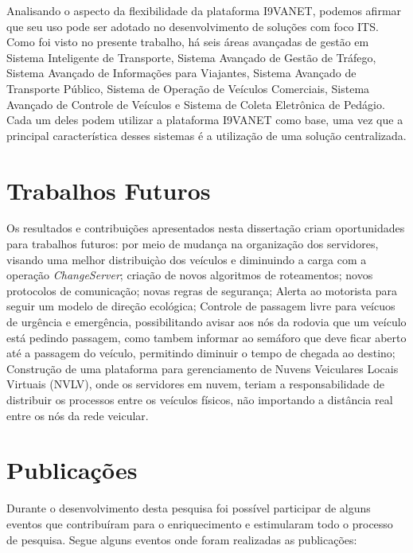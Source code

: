 \documentclass[
	12pt,				%
	oneside,			%
	a4paper,			%
	english,			%
	brazil				%
	]{abntex2ppgsi}
\begin{document}
Analisando o aspecto da flexibilidade da plataforma I9VANET, podemos afirmar que seu uso pode ser adotado no desenvolvimento de soluções com foco ITS. Como foi visto no presente trabalho, há seis áreas avançadas de gestão em Sistema Inteligente de Transporte, Sistema Avançado de Gestão de Tráfego, Sistema Avançado de Informações para Viajantes, Sistema Avançado de Transporte Público, Sistema de Operação de Veículos Comerciais, Sistema Avançado de Controle de Veículos e Sistema de Coleta Eletrônica de Pedágio. Cada um deles podem utilizar a plataforma I9VANET como base, uma vez que a principal característica desses sistemas é a utilização de uma solução centralizada. 

\section{Trabalhos Futuros}

Os resultados e contribuições apresentados nesta dissertação criam oportunidades para trabalhos futuros: por meio de mudança na organização dos servidores, visando uma melhor distribuiçào dos veículos e diminuindo a carga com a operação \textit{ChangeServer}; criação de novos algoritmos de roteamentos; novos protocolos de comunicação; novas regras de segurança; Alerta ao motorista para seguir um modelo de direção ecológica; Controle de passagem livre para veícuos de urgência e emergência, possibilitando avisar aos nós da rodovia que um veículo está pedindo passagem, como tambem informar ao semáforo que deve ficar aberto até a passagem do veículo, permitindo diminuir o tempo de chegada ao destino; Construção de uma plataforma para gerenciamento de Nuvens Veiculares Locais Virtuais (NVLV), onde os servidores em nuvem, teriam a responsabilidade de distribuir os processos entre os veículos físicos, não importando a distância real entre os nós da rede veicular.

\section{Publicações}

Durante o desenvolvimento desta pesquisa foi possível participar de alguns eventos que contribuíram para o enriquecimento e estimularam todo o processo de pesquisa. Segue alguns eventos onde foram realizadas as publicações: 
\end{document}
